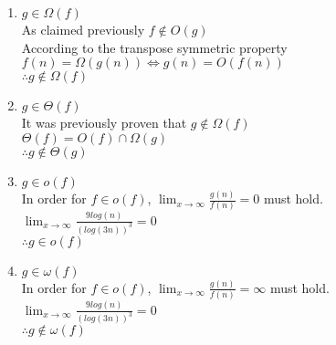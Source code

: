 \documentclass[11pt]{article}
\begin{document}
\begin{enumerate}
			\item $g \in \Omega(f)$ \\
				As claimed previously $ f \notin O(g)$ \\ 
				According to the transpose symmetric property $f(n) = \Omega (g(n)) \Leftrightarrow g(n) = O(f(n)) $ \\
				$\therefore g \notin \Omega (f)$
			
			\item $g \in \Theta(f)$ \\
				It was previously proven that $g \notin \Omega(f)$ \\
				$\Theta(f) = O(f) \cap \Omega(g)$\\
				$\therefore g \notin \Theta (g)$
				
			\item $g \in o(f)$ \\
				In order for $f \in o(f)$, $\lim_{x \to \infty} \frac{g(n)}{f(n)} = 0$	must hold. \\
				$\lim_{x \to \infty} \frac{9log(n)}{(log(3n))^3} = 0 $\\
				$\therefore g \in o(f)$
				
			\item $g \in \omega(f)$ \\
				In order for $f \in o(f)$, $\lim_{x \to \infty} \frac{g(n)}{f(n)} = \infty$	must hold. \\
				$\lim_{x \to \infty} \frac{9log(n)}{(log(3n))^3} = 0 $\\
				$\therefore g \notin \omega(f)$
		\end{enumerate}


	
		
	
	

	
\end{document}
